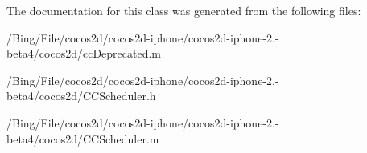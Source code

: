 The documentation for this class was generated from the following files\-:\begin{DoxyCompactItemize}
\item 
/\-Bing/\-File/cocos2d/cocos2d-\/iphone/cocos2d-\/iphone-\/2.-\/beta4/cocos2d/cc\-Deprecated.\-m\item 
/\-Bing/\-File/cocos2d/cocos2d-\/iphone/cocos2d-\/iphone-\/2.-\/beta4/cocos2d/C\-C\-Scheduler.\-h\item 
/\-Bing/\-File/cocos2d/cocos2d-\/iphone/cocos2d-\/iphone-\/2.-\/beta4/cocos2d/C\-C\-Scheduler.\-m\end{DoxyCompactItemize}

